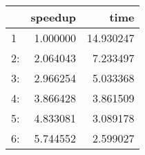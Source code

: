 \begin{tabular}{lrr}
\toprule
{} &   speedup &       time \\
\midrule
1  &  1.000000 &  14.930247 \\
2: &  2.064043 &   7.233497 \\
3: &  2.966254 &   5.033368 \\
4: &  3.866428 &   3.861509 \\
5: &  4.833081 &   3.089178 \\
6: &  5.744552 &   2.599027 \\
\bottomrule
\end{tabular}
